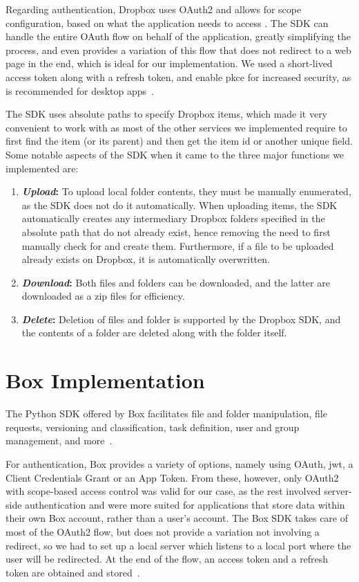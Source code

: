 Regarding authentication, Dropbox uses OAuth2 and allows for scope configuration, based on what the application needs to access . The SDK can handle the entire OAuth flow on behalf of the application, greatly simplifying the process, and even provides a variation of this flow that does not redirect to a web page in the end, which is ideal for our implementation.  We used a short-lived access token along with a refresh token, and enable \ac{pkce} for increased security, as is recommended for desktop apps~\cite{dropbox_oauth}.

The SDK uses absolute paths to specify Dropbox items, which made it very convenient to work with as most of the other services we implemented require to first find the item (or its parent) and then get the item id or another unique field. Some notable aspects of the SDK when it came to the three major functions we implemented are: ~\cite{dropbox_docs}

\begin{enumerate}
    \item \textbf{\textit{Upload}:} To upload local folder contents, they must be manually enumerated, as the SDK does not do it automatically. When uploading items, the SDK automatically creates any intermediary Dropbox folders specified in the absolute path that do not already exist, hence removing the need to first manually check for and create them. Furthermore, if a file to be uploaded already exists on Dropbox, it is automatically overwritten.

    \item \textbf{\textit{Download}:} Both files and folders can be downloaded, and the latter are downloaded as a zip files for efficiency.

    \item \textbf{\textit{Delete}:} Deletion of files and folder is supported by the Dropbox SDK, and the contents of a folder are deleted along with the folder itself.
\end{enumerate}


\section{Box Implementation}
The Python SDK offered by Box facilitates file and folder manipulation, file requests, versioning and classification, task definition, user and group management, and more~\cite{box_docs}.

For authentication, Box provides a variety of options, namely using OAuth, \ac{jwt}, a Client Credentials Grant or an App Token. From these, however, only OAuth2 with scope-based access control was valid for our case, as the rest involved server-side authentication and were more suited for applications that store data within their own Box account, rather than a user's account.  The Box SDK takes care of most of the OAuth2 flow, but does not provide a variation not involving a redirect, so we had to set up a local server which listens to a local port where the user will be redirected. At the end of the flow, an access token and a refresh token are obtained and stored~\cite{box_auth}.

